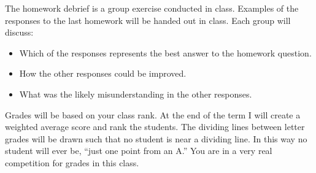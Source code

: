 \documentclass[letterpaper,10pt]{article}
\begin{document}
The homework debrief is a group exercise conducted in class. Examples of the responses to the last homework will be handed out in class.  Each group will discuss:

\begin{itemize}
\item Which of the responses represents the best answer to the homework question.
\item How the other responses could be improved.
\item What was the likely misunderstanding in the other responses.
\end{itemize}


Grades will be based on your class rank. At the end of the term I will
create a weighted average score and rank the students. The dividing
lines between letter grades will be drawn such that no student is near
a dividing line. In this way no student will ever be, ``just one point
from an A.'' You are in a very real competition for grades in this
class. 
\end{document}
